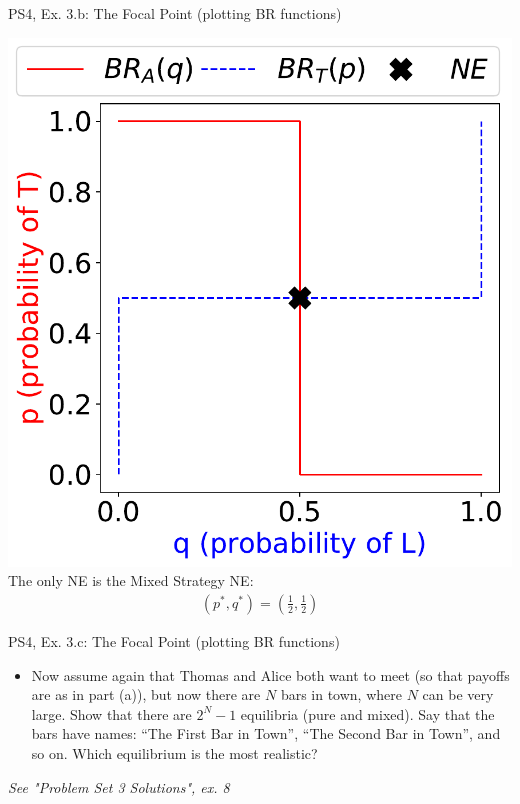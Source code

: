 \begin{frame}{PS4, Ex. 3.b: The Focal Point (plotting BR functions)}
\begin{multicols}{2}
    \includegraphics[width=\columnwidth]{figures/3b}
    The only NE is the Mixed Strategy NE:
    \begin{align*}
      (p^{*},q^{*})=\left(\frac{1}{2},\frac{1}{2}\right)
    \end{align*}
  \vfill\null
  \end{multicols}
\end{frame}
\begin{frame}{PS4, Ex. 3.c: The Focal Point (plotting BR functions)}
  \begin{multicols}{2}
    \begin{itemize}
      \item[(c)] Now assume again that Thomas and Alice both want to meet (so that payoffs are as in part (a)), but now there are $N$ bars in town, where $N$ can be very large. Show that there are $2^N-1$ equilibria (pure and mixed). Say that the bars have names: “The First Bar in Town”, “The Second Bar in Town”, and so on. Which equilibrium is the most realistic?
    \end{itemize}
  \vfill\null \columnbreak
    \textit{See "Problem Set 3 Solutions", ex. 8}
  \vfill\null
  \end{multicols}
\end{frame}


